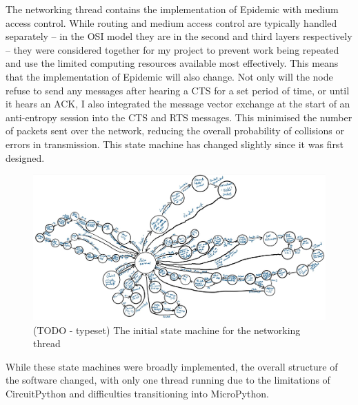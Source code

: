 \documentclass[12pt,a4paper]{report}
\begin{document}
The networking thread contains the implementation of Epidemic with medium access control. While routing and medium access control are typically handled separately -- in the OSI model they are in the second and third layers respectively -- they were considered together for my project to prevent work being repeated and use the limited computing resources available most effectively. This means that the implementation of Epidemic will also change. Not only will the node refuse to send any messages after hearing a CTS for a set period of time, or until it hears an ACK, I also integrated the message vector exchange at the start of an anti-entropy session into the CTS and RTS messages. This minimised the number of packets sent over the network, reducing the overall probability of collisions or errors in transmission. This state machine has changed slightly since it was first designed. 
\begin{figure}[h]
\begin{center}
\includegraphics[scale=0.5]{net.jpg}
\end{center}
\caption{(TODO - typeset) The initial state machine for the networking thread}
\end{figure}
\FloatBarrier
While these state machines were broadly implemented, the overall structure of the software changed, with only one thread running due to the limitations of CircuitPython and difficulties transitioning into MicroPython.


\end{document}
